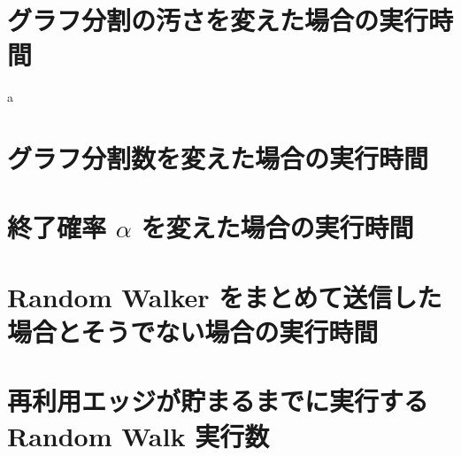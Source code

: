\section{グラフ分割の汚さを変えた場合の実行時間}\label{グラフ分割の汚さを変えた場合の実行時間}

a

\section{グラフ分割数を変えた場合の実行時間}\label{グラフ分割数を変えた場合の実行時間}

\section{終了確率 $\alpha$ を変えた場合の実行時間}\label{終了確率 alpha を変えた場合の実行時間}

\section{Random Walker をまとめて送信した場合とそうでない場合の実行時間}\label{Random Walker をまとめて送信した場合とそうでない場合の実行時間}

\section{再利用エッジが貯まるまでに実行する Random Walk 実行数}\label{再利用エッジが貯まるまでに実行する Random Walk 実行数}